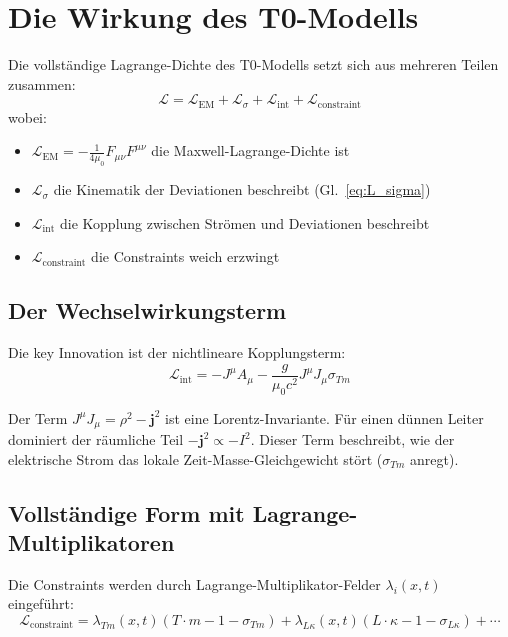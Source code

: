 	\section{Die Wirkung des T0-Modells}
	Die vollständige Lagrange-Dichte des T0-Modells setzt sich aus mehreren Teilen zusammen:
	\begin{equation}
		\mathcal{L} = \mathcal{L}_{\text{EM}} + \mathcal{L}_{\sigma} + \mathcal{L}_{\text{int}} + \mathcal{L}_{\text{constraint}} \label{eq:full_L}
	\end{equation}
	wobei:
	\begin{itemize}
		\item $\mathcal{L}_{\text{EM}} = -\frac{1}{4\mu_0} F_{\mu\nu} F^{\mu\nu}$ die Maxwell-Lagrange-Dichte ist
		\item $\mathcal{L}_{\sigma}$ die Kinematik der Deviationen beschreibt (Gl.~\ref{eq:L_sigma})
		\item $\mathcal{L}_{\text{int}}$ die Kopplung zwischen Strömen und Deviationen beschreibt
		\item $\mathcal{L}_{\text{constraint}}$ die Constraints weich erzwingt
	\end{itemize}
	
	\subsection{Der Wechselwirkungsterm}
	Die key Innovation ist der nichtlineare Kopplungsterm:
	\begin{equation}
		\mathcal{L}_{\text{int}} = -J^\mu A_\mu - \frac{g}{\mu_0 c^2} J^\mu J_\mu \sigma_{Tm} \label{eq:L_int}
	\end{equation}
	
	Der Term $J^\mu J_\mu = \rho^2 - \mathbf{j}^2$ ist eine Lorentz-Invariante. Für einen dünnen Leiter dominiert der räumliche Teil $-\mathbf{j}^2 \propto -I^2$. Dieser Term beschreibt, wie der elektrische Strom das lokale Zeit-Masse-Gleichgewicht stört ($\sigma_{Tm}$ anregt).
	
	\subsection{Vollständige Form mit Lagrange-Multiplikatoren}
	Die Constraints werden durch Lagrange-Multiplikator-Felder $\lambda_i(x,t)$ eingeführt:
	\begin{equation}
		\mathcal{L}_{\text{constraint}} = \lambda_{Tm}(x,t) (T \cdot m - 1 - \sigma_{Tm}) + \lambda_{L\kappa}(x,t) (L \cdot \kappa - 1 - \sigma_{L\kappa}) + \cdots \label{eq:L_constraint}
	\end{equation}
	
